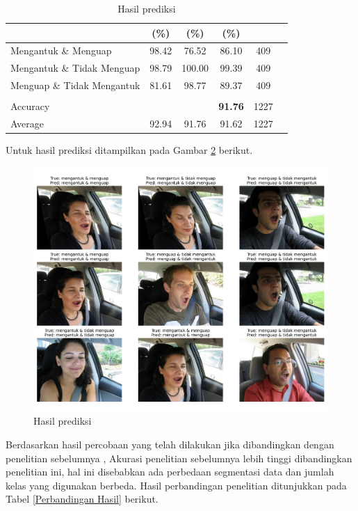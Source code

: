 \begin{table}[H]
\begin{table}[H]
\begin{tabular}{lccccc}
              & \textbf{(\%)} & \textbf{(\%)} & \textbf{(\%)} \\
            \midrule
            Mengantuk \& Menguap & 98.42 & 76.52 & 86.10 & 409 \\
            Mengantuk \& Tidak Menguap & 98.79 & 100.00 & 99.39 & 409 \\
            Menguap \& Tidak Mengantuk & 81.61 & 98.77 & 89.37 & 409 \\ \hline
            & & & & \\
            Accuracy & & & \textbf{91.76} & 1227 \\
            Average & 92.94 & 91.76 & 91.62 & 1227 \\
      
          
             \bottomrule
        \end{tabular}
        \label{Evaluasi Model}
    \end{table}

    Untuk hasil prediksi ditampilkan pada Gambar \ref{hasil prediksi} berikut.
          \begin{figure}[H]
              \centering
              \includegraphics[width=1.0\linewidth]{figures/bab4/hasil_prediksi.png}
              \caption{Hasil prediksi}
              \label{hasil prediksi}
          \end{figure}

    
        
        
    Berdasarkan hasil percobaan yang telah dilakukan jika dibandingkan dengan penelitian sebelumnya \cite{majeed2023detection}, Akurasi penelitian sebelumnya lebih tinggi dibandingkan penelitian ini, hal ini disebabkan ada perbedaan segmentasi data dan jumlah kelas yang digunakan berbeda. Hasil perbandingan penelitian ditunjukkan pada Tabel \ref{Perbandingan Hasil} berikut. 



\end{table}

